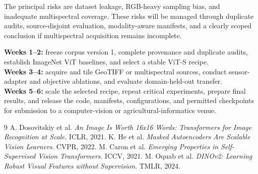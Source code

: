 \documentclass[10pt,twocolumn,letterpaper]{article}
\begin{document}
The principal risks are dataset leakage, RGB-heavy sampling bias, and inadequate multispectral coverage. These risks will be managed through duplicate audits, source-disjoint evaluation, modality-aware manifests, and a clearly scoped conclusion if multispectral acquisition remains incomplete.

\textbf{Weeks 1--2:} freeze corpus version 1, complete provenance and duplicate audits, establish ImageNet ViT baselines, and select a stable ViT-S recipe.\\
\textbf{Weeks 3--4:} acquire and tile GeoTIFF or multispectral sources, conduct sensor-adapter and objective ablations, and evaluate domain-held-out transfer.\\
\textbf{Weeks 5--6:} scale the selected recipe, repeat critical experiments, prepare final results, and release the code, manifests, configurations, and permitted checkpoints for submission to a computer-vision or agricultural-informatics venue.

\small
\begin{thebibliography}{9}
A. Dosovitskiy et al. \textit{An Image Is Worth 16x16 Words: Transformers for Image Recognition at Scale}. ICLR, 2021.
K. He et al. \textit{Masked Autoencoders Are Scalable Vision Learners}. CVPR, 2022.
M. Caron et al. \textit{Emerging Properties in Self-Supervised Vision Transformers}. ICCV, 2021.
M. Oquab et al. \textit{DINOv2: Learning Robust Visual Features without Supervision}. TMLR, 2024.
\end{thebibliography}
\end{document}
